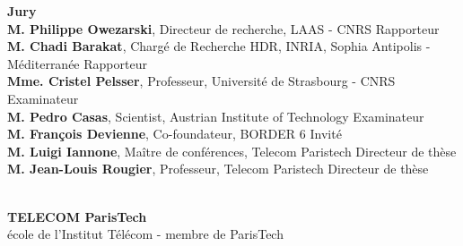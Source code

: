 \documentclass[11pt,a4paper]{book}
\begin{document}
\begin{minipage}{.91\textwidth}	%
{\bf Jury}\\
{\bf M. Philippe Owezarski}, {\small Directeur de recherche, LAAS - CNRS}
	\hfill Rapporteur\\
{\bf M. Chadi Barakat}, {\small Chargé de Recherche HDR, INRIA, Sophia Antipolis - Méditerranée}
	\hfill Rapporteur\\
{\bf Mme. Cristel Pelsser}, {\small Professeur, Université de Strasbourg - CNRS}
	\hfill Examinateur\\
{\bf M. Pedro Casas}, {\small Scientist, Austrian Institute of Technology}
	\hfill Examinateur\\
{\bf M. François Devienne}, {\small Co-foundateur, BORDER 6}
	\hfill Invit\'{e}\\
{\bf M. Luigi Iannone}, {\small Maître de conf\'{e}rences, Telecom Paristech}
	\hfill Directeur de th\`{e}se\\
{\bf M. Jean-Louis Rougier}, {\small Professeur, Telecom Paristech}
	\hfill Directeur de th\`{e}se\\

\end{minipage}\\
%
%
%
%
%
%
\centering
{\bf TELECOM ParisTech}\\
{\small école de l'Institut Télécom - membre de ParisTech}
%
%
%
\end{document}
